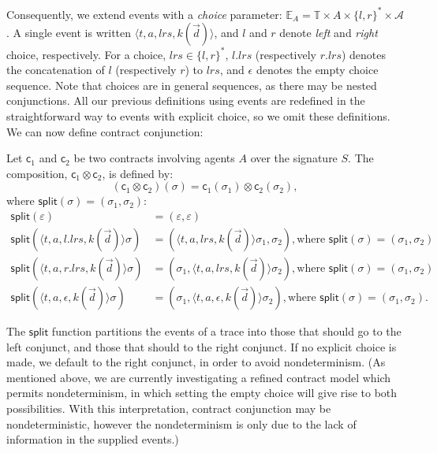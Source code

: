 \documentclass[orivec,final]{llncs-href}
\newcommand{\actionset}{\mathcal{A}}
\newcommand{\timeset}{\mathbb{T}}
\newcommand{\eventset}[1]{\mathbb{E}_{#1}}
\newcommand{\tracesplit}{\mathsf{split}}
\newcommand{\trace}{\sigma}
\newcommand{\emptytrace}{\varepsilon}
\newcommand{\emptychoice}{\epsilon}
\newcommand{\choice}{\mathit{lrs}}
\newcommand{\contract}{\mathsf{c}}
\newcommand{\event}[3]{\langle #1,#2,#3\rangle}
\begin{document}
Consequently, we extend events with a \emph{choice} parameter:
\renewcommand{\event}[4]{\langle #1, #2, #3, #4 \rangle}
$\eventset{A} = \timeset \times A \times \{l,r\}^* \times
\actionset$. A single event is written
$\event{t}{a}{\choice}{k(\vec{d})}$, and $l$ and $r$ denote
\emph{left} and \emph{right} choice, respectively. For a choice,
$\choice \in \{l,r\}^*$, $l.\choice$ (respectively $r.\choice$)
denotes the concatenation of $l$ (respectively $r$) to $\choice$, and
$\emptychoice$ denotes the empty choice sequence. Note that choices
are in general sequences, as there may be nested conjunctions. All our
previous definitions using events are redefined in the straightforward
way to events with explicit choice, so we omit these definitions. We
can now define contract conjunction:
\begin{definition}\label{def:contractconjunction}
  Let $\contract_1$ and $\contract_2$ be two contracts involving
  agents $A$ over the signature $S$. The composition, $\contract_1
  \otimes \contract_2$, is defined by:
  \[
  (\contract_1 \otimes  \contract_2)(\trace) = 
  \contract_1(\trace_1) \otimes \contract_2(\trace_2),
 \]
  where $\tracesplit(\trace) = (\trace_1,\trace_2)$:
  \begin{align*}
    \tracesplit(\emptytrace) &= (\emptytrace,\emptytrace)\\
    \tracesplit(\event{t}{a}{l . \choice}{k(\vec{d})}\trace) &=
    (\event{t}{a}{\choice}{k(\vec{d})}\trace_1,\trace_2), \mbox{
      where } \tracesplit(\trace) = (\trace_1,\trace_2)\\
    \tracesplit(\event{t}{a}{r . \choice}{k(\vec{d})}\trace) &=
    (\trace_1,\event{t}{a}{\choice}{k(\vec{d})}\trace_2), \mbox{
      where } \tracesplit(\trace) = (\trace_1,\trace_2)\\
    \tracesplit(\event{t}{a}{\emptychoice}{k(\vec{d})}\trace) &=
    (\trace_1,\event{t}{a}{\emptychoice}{k(\vec{d})}\trace_2), \mbox{
      where } \tracesplit(\trace) = (\trace_1,\trace_2) .
  \end{align*}
\end{definition}

The $\tracesplit$ function partitions the events of a trace into
those that should go to the left conjunct, and those that should to
the right conjunct. If no explicit choice is made, we default to the
right conjunct, in order to avoid nondeterminism. (As mentioned above,
we are currently investigating a refined contract model which permits
nondeterminism, in which setting the empty choice will give rise to both
possibilities. With this interpretation, contract conjunction may be
nondeterministic, however the nondeterminism is only due to the lack
of information in the supplied events.)
\end{document}
